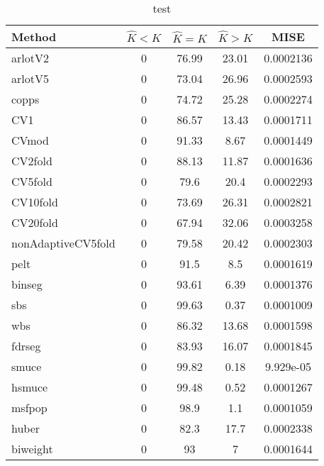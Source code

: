 \begin{table}[ht]
\centering
\begin{tabular}{l|cccc}
  \hline
Method & $\hat{K} < K$ & $\hat{K} = K$ & $\hat{K} > K$ & MISE \\ 
  \hline
arlotV2 &     0 & 76.99 & 23.01 & 0.0002136 \\ 
  arlotV5 &     0 & 73.04 & 26.96 & 0.0002593 \\ 
  copps &     0 & 74.72 & 25.28 & 0.0002274 \\ 
  CV1 &     0 & 86.57 & 13.43 & 0.0001711 \\ 
  CVmod &     0 & 91.33 &  8.67 & 0.0001449 \\ 
  CV2fold &     0 & 88.13 & 11.87 & 0.0001636 \\ 
  CV5fold &     0 &  79.6 &  20.4 & 0.0002293 \\ 
  CV10fold &     0 & 73.69 & 26.31 & 0.0002821 \\ 
  CV20fold &     0 & 67.94 & 32.06 & 0.0003258 \\ 
  nonAdaptiveCV5fold &     0 & 79.58 & 20.42 & 0.0002303 \\ 
  pelt &     0 &  91.5 &   8.5 & 0.0001619 \\ 
  binseg &     0 & 93.61 &  6.39 & 0.0001376 \\ 
  sbs &     0 & 99.63 &  0.37 & 0.0001009 \\ 
  wbs &     0 & 86.32 & 13.68 & 0.0001598 \\ 
  fdrseg &     0 & 83.93 & 16.07 & 0.0001845 \\ 
  smuce &     0 & 99.82 &  0.18 & 9.929e-05 \\ 
  hsmuce &     0 & 99.48 &  0.52 & 0.0001267 \\ 
  msfpop &     0 &  98.9 &   1.1 & 0.0001059 \\ 
  huber &     0 &  82.3 &  17.7 & 0.0002338 \\ 
  biweight &     0 &    93 &     7 & 0.0001644 \\ 
   \hline
\end{tabular}
\caption{test} 
\end{table}
